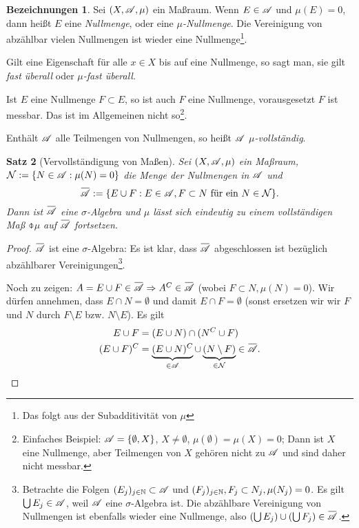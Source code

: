 \documentclass[
 a4paper,
 12pt,
 parskip=half
 ]{scrreprt}
\theoremstyle{plain}
\newtheorem{thm}{Satz}[section] %
\theoremstyle{definition}
\newtheorem{deno}[thm]{Bezeichnungen}
\numberwithin{equation}{section}
\begin{document}
\begin{deno}
 Sei $(X, \mathscr{A}, \mu)$ ein Maßraum. Wenn $E \in \mathscr{A}$ und $\mu(E) = 0$, dann heißt $E$ eine \emph{Nullmenge}, oder eine \emph{$\mu$-Nullmenge}. Die Vereinigung von abzählbar vielen Nullmengen ist wieder eine Nullmenge\footnote{Das folgt aus der Subadditivität von $\mu$}.
 
 Gilt eine Eigenschaft für alle $x \in X$ bis auf eine Nullmenge, so sagt man, sie gilt \emph{fast überall} oder \emph{$\mu$-fast überall}.
 
 Ist $E$ eine Nullmenge $F \subset E$, so ist auch $F$ eine Nullmenge, vorausgesetzt $F$ ist messbar. Das ist im Allgemeinen nicht so\footnote{Einfaches Beispiel: $\mathscr{A} = \{ \emptyset, X \}$, $X \ne \emptyset$, $\mu( \emptyset ) = \mu(X) = 0$; Dann ist $X$ eine Nullmenge, aber Teilmengen von $X$ gehören nicht zu $\mathscr{A}$ und sind daher nicht messbar.}.
 
 Enthält $\mathscr{A}$ alle Teilmengen von Nullmengen, so heißt $\mathscr{A}$ \emph{$\mu$-vollständig}.
\end{deno}

\begin{thm}[Vervollständigung von Maßen]
 Sei $(X, \mathscr{A}, \mu)$ ein Maßraum, $\mathcal{N} := \{ N \in \mathscr{A}: \mu(N) = 0 \}$ die Menge der Nullmengen in $\mathscr{A}$ und 
 \[ \obar{\mA} := \{ E \cup F : E \in \mA, F \subset N \text{ für ein } N \in \mathcal{N} \}. \]
 Dann ist $\obar{\mA}$ eine $\sigma$-Algebra und $\mu$ lässt sich eindeutig zu einem vollständigen Maß $\obar{\mu}$ auf $\obar{\mA}$ fortsetzen.
\end{thm}

\begin{proof}
 $\obar{\mA}$ ist eine $\sigma$-Algebra: Es ist klar, dass $\obar{\mA}$ abgeschlossen ist bezüglich abzählbarer Vereinigungen\footnote{Betrachte die Folgen $(E_j)_{j \in \mathbb{N}} \subset \mathscr{A}$ und $(F_j)_{j \in \mathbb{N}}, F_j \subset N_j, \mu(N_j) = 0$. Es gilt $\bigcup E_j \in \mathscr{A}$, weil $\mathscr{A}$ eine $\sigma$-Algebra ist. Die abzählbare Vereinigung von Nullmengen ist ebenfalls wieder eine Nullmenge, also $(\bigcup E_j) \cup (\bigcup F_j) \in \obar{\mA}$.}.
 
 Noch zu zeigen: $A = E \cup F \in \obar{\mA} \Rightarrow A^C \in \obar{\mA}$ (wobei $F \subset N, \mu(N) = 0$). Wir dürfen annehmen, dass $E \cap N = \emptyset$ und damit $E \cap F = \emptyset$ (sonst ersetzen wir wir $F$ und $N$ durch $F \setminus E$ bzw. $N \setminus E$). Es gilt
 \begin{align*}
  E \cup F &= ( E \cup N ) \cap (N^C \cup F) \\
  (E \cup F)^C &= \underbrace{( E \cup N )^C}_{\in \mA} \cup \underbrace{(N \setminus F)}_{\in \mathcal{N}} \in \obar{\mA}. \qedhere
 \end{align*}
\end{proof}
\end{document}
